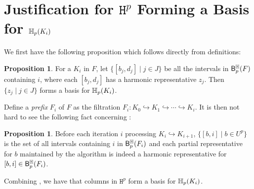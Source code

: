 \documentclass[10pt,a4paper]{amsart}
\newcommand {\mm}[1] {\ifmmode{#1}\else{\mbox{\(#1\)}}\fi}
\newcommand{\har}           {\mm{\mathbb{H}}}
\theoremstyle{definition}
\newcommand{\filt}{F}
\newcommand{\incto}{\hookrightarrow}
\newcommand{\hbarc}{\mathsf{B}^\har}
\newcommand{\Harmat}{\mathtt{H}}
\newtheorem{proposition}[theorem]{Proposition}
\theoremstyle{remark}
\begin{document}
\section{Justification for $\Harmat^p$ Forming a Basis for $\har_p(K_i)$}\label{sec:harmat-basis}

We first have the following proposition which follows directly from definitions:
\begin{proposition}\label{prop:har-rep-basis}
For a $K_i$ in $\filt$,
let $\{[b_j,d_j]\mid j\in J\}$ 
be all the intervals in $\hbarc_p(\filt)$ containing $i$,
where each $[b_j,d_j]$ has a harmonic representative $z_j$.
Then $\{z_j\mid j\in J\}$ forms a basis for $\har_p(K_i)$.
\end{proposition}

Define a \emph{prefix} $\filt_i$ of $\filt$ as the filtration
$\filt_i: 
K_0 \incto K_1 \incto
\cdots \incto K_i.$
It is then not hard to see the following fact concerning :
\begin{proposition}\label{prop:iter-unpair-to-i}
Before each iteration $i$
processing $K_{i}\incto K_{i+1}$,
$\{[b,i]\mid b\in U^p\}$
is the set of all intervals containing $i$
in $\hbarc_p(\filt_i)$
and each partial representative for $b$
maintained by the algorithm
is indeed a harmonic representative for $[b,i]\in \hbarc_p(\filt_i)$.
\end{proposition}

Combining ,
we have that columns in $\Harmat^p$ form a basis for $\har_p(K_i)$.

\end{document}
